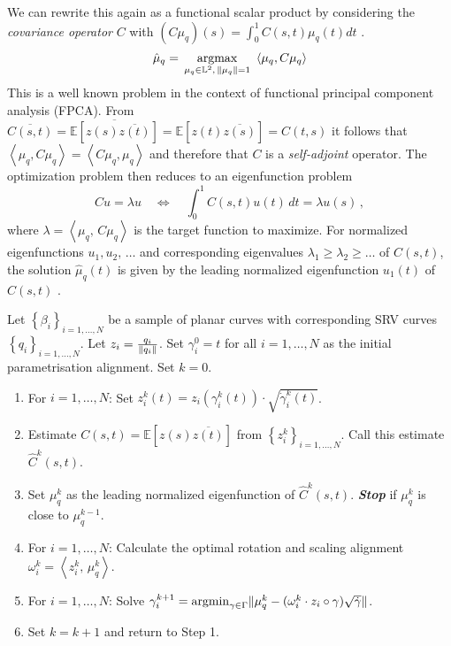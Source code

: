 We can rewrite this again as a functional scalar product by considering the \emph{covariance operator} $C$ with $(C\mu_q)(s) = \int_0^1 C(s,t) \mu_q(t) dt$ \parencite[see][153]{RamsaySilverman2005}.
\begin{equation}
  \label{eq:quadr_opt}
  \hat\mu_q = \, \operatorname*{argmax}_{\mu_q \in \mathbb{L}^2,\,\lVert\mu_q\rVert = 1}\,\,
    \left\langle \mu_q, C\mu_q \right\rangle
\end{equation}
This is a well known problem in the context of functional principal component analysis (FPCA).
From $\overline{C(s,t)} = \overline{\mathbb{E}[z(s)\overline{z(t)}]} = \mathbb{E}[z(t)\overline{z(s)}] = C(t,s)$ it follows that $\left\langle \mu_q, C \mu_q \right\rangle = \left\langle C \mu_q, \mu_q \right\rangle$ and therefore that $C$ is a \emph{self-adjoint} operator.
The optimization problem then reduces to an eigenfunction problem 
\begin{equation}
  \label{eq:funceig}
  Cu = \lambda u \quad \Leftrightarrow \quad \int_0^1 C(s, t) u(t)\, dt = \lambda u(s)\,,
\end{equation}
where $\lambda = \left\langle \mu_q,\, C \mu_q \right\rangle$ is the target function to maximize.
For normalized eigenfunctions $u_1, u_2,\,\dots$ and corresponding eigenvalues $\lambda_1 \geq \lambda_2 \geq \dots$ of $C(s,t)$, the solution $\hat\mu_q(t)$ is given by the leading normalized eigenfunction $u_1(t)$ of $C(s,t)$ \parencite[see][153,397]{RamsaySilverman2005}.

\begin{algorithm}
  \label{algo:mean}
  Let $\left\{\beta_i\right\}_{i=1,\dots,N}$ be a sample of planar curves with corresponding SRV curves $\left\{ q_i \right\}_{i=1,\dots,N}$.
  Let $z_i = \frac{q_i}{\lVert q_i\rVert}$.
  Set $\gamma_i^0 = t$ for all $i=1,\dots,N$ as the initial parametrisation alignment.
  Set $k = 0$. 
  \begin{enumerate}
    \item For $i=1,\dots,N$: Set $z_i^k(t) = z_i\left(\gamma^k_i(t)\right) \cdot \sqrt{\dot\gamma_i^k(t)}$.
    \item Estimate $C(s,t) = \mathbb{E}[z(s)\overline{z(t)}]$ from $\left\{z_i^k\right\}_{i=1,\dots,N}$. Call this estimate $\hat{C}^k(s,t)$.
    \item Set $\mu_q^k$ as the leading normalized eigenfunction of $\hat{C}^k(s,t)$. \emph{\textbf{Stop}} if $\mu_q^k$ is close to $\mu_q^{k-1}$.
    \item For $i=1,\dots,N$: Calculate the optimal rotation and scaling alignment $\omega^k_i = \left\langle z_i^k,\, \mu_q^k \right\rangle$.
    \item For $i=1,\dots,N$: Solve $\gamma_i^{k+1} = \operatorname*{argmin}_{\gamma \in \Gamma} \lVert\mu_q^k - (\omega_i^k \cdot z_i \circ \gamma ) \sqrt{\dot\gamma}\rVert$.
    \item Set $k = k+1$ and return to Step 1.
  \end{enumerate}
\end{algorithm}

